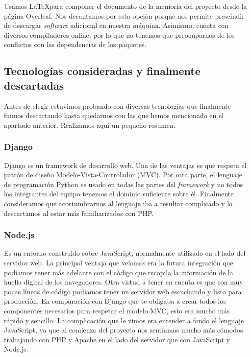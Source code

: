 Usamos \LaTeX\space  para componer el documento de la memoria del proyecto desde la página Overleaf. Nos decantamos por esta opción porque nos permite prescindir de descargar \textit{software} adicional en nuestra máquina. Asimismo, cuenta con diversos compiladores online, por lo que no tenemos que preocuparnos de los conflictos con las dependencias de los paquetes. \par 

\subsection{Tecnologías consideradas y finalmente descartadas}
\label{subsec:rejected}
Antes de elegir estuvimos probando con diversas tecnologías que finalmente fuimos descartando hasta quedarnos con las que hemos mencionado en el apartado anterior. Realizamos aquí un pequeño resumen. \par 

\subsubsection{Django}
Django es un framework de desarrollo web. Una de las ventajas es que respeta el patrón de diseño Modelo-Vista-Controlador (MVC). Por otra parte, el lenguaje de programación Python es usado en todas las partes del\textit{ framework} y no todos los integrantes del equipo tenemos el dominio suficiente sobre él. Finalmente consideramos que acostumbrarnos al lenguaje iba a resultar complicado y lo descartamos al estar más familiarizados con PHP. \par 

\subsubsection{Node.js}
Es un entorno construido sobre JavaScript, normalmente utilizado en el lado del servidor web. La principal ventaja que veíamos era la futura integración que podíamos tener más adelante con el código que recopila la información de la huella digital de los navegadores. Otra virtud a tener en cuenta es que con muy pocas líneas de código podíamos tener un servidor web escuchando y listo para producción. En comparación con Django que te obligaba a crear todos los componentes necesarios para respetar el modelo MVC, esto era mucho más rápido y sencillo. La complicación que le vimos era entender a fondo el lenguaje JavaScript, ya que al comienzo del proyecto nos sentíamos mucho más cómodos trabajando con PHP y Apache en el lado del servidor que con JavaScript y Node.js. \par 

